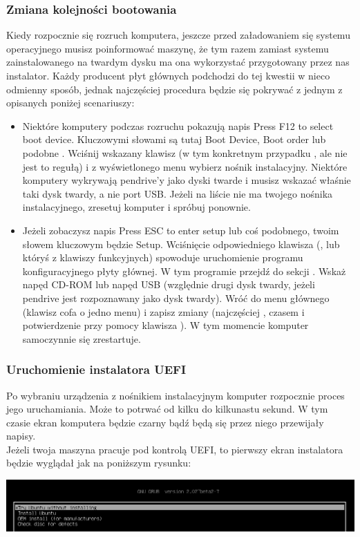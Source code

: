 \subsubsection{Zmiana kolejności bootowania}
Kiedy rozpocznie się rozruch komputera, jeszcze przed załadowaniem się systemu operacyjnego musisz poinformować maszynę, że tym razem zamiast systemu zainstalowanego na twardym dysku ma ona wykorzystać przygotowany przez nas instalator. Każdy producent płyt głównych podchodzi do tej kwestii w nieco odmienny sposób, jednak najczęściej procedura będzie się pokrywać z jednym z opisanych poniżej scenariuszy:
\begin{itemize}
\item Niektóre komputery podczas rozruchu pokazują napis \textcolor{ubuntu_orange}{Press F12 to select boot device}. Kluczowymi słowami są tutaj \textcolor{ubuntu_orange}{Boot Device}, \textcolor{ubuntu_orange}{Boot order} lub podobne . Wciśnij wskazany klawisz (w tym konkretnym przypadku , ale nie jest to regułą) i z wyświetlonego menu wybierz nośnik instalacyjny. Niektóre komputery wykrywają pendrive'y jako dyski twarde i musisz wskazać właśnie taki dysk twardy, a nie port USB. Jeżeli na liście nie ma twojego nośnika instalacyjnego, zresetuj komputer i spróbuj ponownie.
\item Jeżeli zobaczysz napis \textcolor{ubuntu_orange}{Press ESC to enter setup} lub coś podobnego, twoim słowem kluczowym będzie \textcolor{ubuntu_orange}{Setup}. Wciśnięcie odpowiedniego klawisza (\keys{\escwin}, \keys{\delwin} lub któryś z klawiszy funkcyjnych) spowoduje uruchomienie programu konfiguracyjnego płyty głównej. W tym programie przejdź do sekcji . Wskaż napęd CD-ROM lub napęd USB (względnie drugi dysk twardy, jeżeli pendrive jest rozpoznawany jako dysk twardy). Wróć do menu głównego (klawisz \keys{\escwin} cofa o jedno menu) i zapisz zmiany (najczęściej , czasem \keys{\escwin} i potwierdzenie przy pomocy klawisza ). W tym momencie komputer samoczynnie się zrestartuje.
\end{itemize}
\subsubsection{Uruchomienie instalatora UEFI}
\label{instalacja_uruchomienie_uefi}
Po wybraniu urządzenia z nośnikiem instalacyjnym komputer rozpocznie proces jego uruchamiania. Może to potrwać od kilku do kilkunastu sekund. W tym czasie ekran komputera będzie czarny bądź będą się przez niego przewijały napisy.\\
Jeżeli twoja maszyna pracuje pod kontrolą UEFI, to pierwszy ekran instalatora będzie wyglądał jak na poniższym rysunku:
\begin{center}
        \includegraphics[width=\linewidth]{images/instalacja_UEFI_boot.png}
\end{center}

